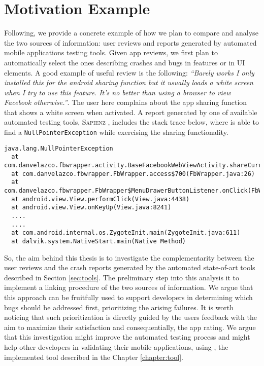 \section{Motivation Example}
Following, we provide a concrete example of how we plan to compare and analyse the two sources of information: user reviews and reports generated by automated mobile applications testing tools. Given app reviews, we first plan to automatically select the ones describing crashes and bugs in features or in UI elements.
A good example of useful review is the following: 
\smallbreak
\emph{\small``Barely works I only installed this for the android sharing function but it usually loads a white screen when I try to use this feature. It's no better than using a browser to view Facebook otherwise.''}. 
\smallbreak
The user here complains about the app sharing function that shows a white screen when activated. A report generated by one of available automated testing tools, \textsc{Sapienz} \cite{sapienz}, includes the stack trace below, where \sapienz is able to find a \texttt{NullPointerException} while exercising the sharing functionality. 
\smallbreak
\begin{lstlisting}[basicstyle=\fontsize{5.5}{8}\ttfamily]
java.lang.NullPointerException
  at com.danvelazco.fbwrapper.activity.BaseFacebookWebViewActivity.shareCurrentPage(BaseFacebookWebViewActivity.java:418)
  at com.danvelazco.fbwrapper.FbWrapper.access$700(FbWrapper.java:26)
  at com.danvelazco.fbwrapper.FbWrapper$MenuDrawerButtonListener.onClick(FbWrapper.java:376)
  at android.view.View.performClick(View.java:4438)
  at android.view.View.onKeyUp(View.java:8241)
  ....
  ....
  at com.android.internal.os.ZygoteInit.main(ZygoteInit.java:611)
  at dalvik.system.NativeStart.main(Native Method)
\end{lstlisting}
\smallbreak
So, the aim behind this thesis is to investigate the complementarity between the user reviews and the crash reports generated by the automated state-of-art tools described in Section \ref{sec:tools}.
The preliminary step into this analysis it to implement a linking procedure of the two sources of information. We argue that this approach can be fruitfully used to support developers in determining which bugs should be addressed first, prioritizing the arising failures. It is worth noticing that such prioritization is directly guided by the users feedback with the aim to maximize their satisfaction and consequentially, the app rating.
We argue that this investigation might improve the automated testing process and might help other developers in validating their mobile applications, using \toolname, the implemented tool described in the Chapter \ref{chapter:tool}.


